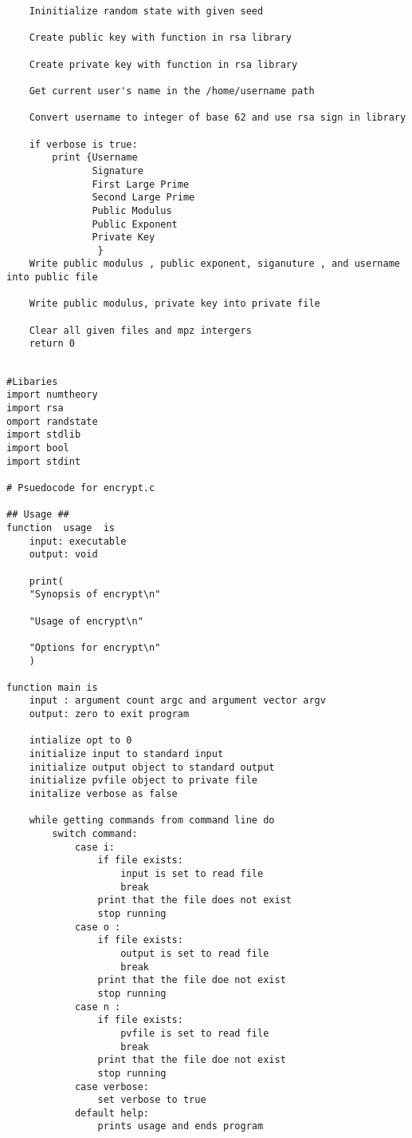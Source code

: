 \documentclass[11pt]{article} %
\begin{document}
\begin{flushleft}
\begin{lstlisting}
    Ininitialize random state with given seed
    
    Create public key with function in rsa library

    Create private key with function in rsa library

    Get current user's name in the /home/username path
    
    Convert username to integer of base 62 and use rsa sign in library

    if verbose is true:
        print {Username
               Signature
               First Large Prime 
               Second Large Prime
               Public Modulus
               Public Exponent
               Private Key 
                } 
    Write public modulus , public exponent, siganuture , and username into public file

    Write public modulus, private key into private file

    Clear all given files and mpz intergers
    return 0
\end{lstlisting}

\begin{lstlisting}

#Libaries
import numtheory
import rsa
omport randstate
import stdlib
import bool
import stdint

# Psuedocode for encrypt.c

## Usage ##
function  usage  is
    input: executable
    output: void

    print(
    "Synopsis of encrypt\n"

    "Usage of encrypt\n"

    "Options for encrypt\n"
    )

function main is
    input : argument count argc and argument vector argv
    output: zero to exit program
    
    intialize opt to 0
    initialize input to standard input
    initialize output object to standard output
    initialize pvfile object to private file 
    initalize verbose as false

    while getting commands from command line do
        switch command:
            case i:
                if file exists:
                    input is set to read file
                    break
                print that the file does not exist
                stop running
            case o :
                if file exists:
                    output is set to read file 
                    break
                print that the file doe not exist
                stop running
            case n :
                if file exists:
                    pvfile is set to read file 
                    break
                print that the file doe not exist
                stop running
            case verbose:
                set verbose to true
            default help:
                prints usage and ends program
    

\end{lstlisting}
\end{flushleft}
\end{document}
